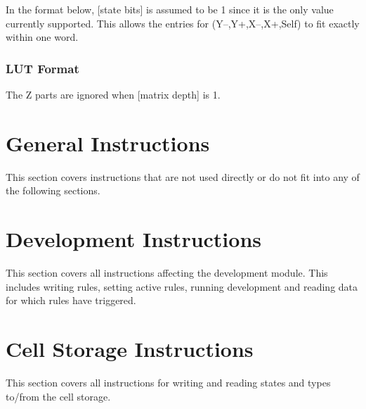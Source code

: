 \documentclass[a4paper,twoside,12pt]{article}
\begin{document}
In the format below, [state bits] is assumed to be 1 since it is the only value currently supported.
This allows the entries for (Y–,Y+,X–,X+,Self) to fit exactly within one word.

\subsubsection*{LUT Format}


\notes

The Z parts are ignored when [matrix depth] is 1.

\cleardoublepage
\section{General Instructions}

This section covers instructions that are not used directly or do not fit into any of the following sections.









\cleardoublepage
\section{Development Instructions}

This section covers all instructions affecting the development module.
This includes writing rules, setting active rules, running development and reading data for which rules have triggered.









\cleardoublepage
\section{Cell Storage Instructions}

This section covers all instructions for writing and reading states and types to/from the cell storage.
\end{document}
